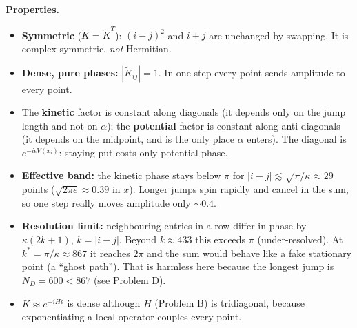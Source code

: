 \documentclass[10pt]{article}
\begin{document}
\textbf{Properties.}
\begin{itemize}
\item \textbf{Symmetric} ($\tilde K=\tilde K^T$): $(i-j)^2$ and $i+j$ are unchanged by swapping. It is complex symmetric, \emph{not} Hermitian.
\item \textbf{Dense, pure phases:} $|\tilde K_{ij}|=1$. In one step every point sends amplitude to every point.
\item The \textbf{kinetic} factor is constant along diagonals (it depends only on the jump length and not on $\alpha$); the \textbf{potential} factor is constant along anti-diagonals (it depends on the midpoint, and is the only place $\alpha$ enters). The diagonal is $e^{-i\epsilon V(x_i)}$: staying put costs only potential phase.
\item \textbf{Effective band:} the kinetic phase stays below $\pi$ for $|i-j|\lesssim\sqrt{\pi/\kappa}\approx29$ points ($\sqrt{2\pi\epsilon}\approx0.39$ in $x$). Longer jumps spin rapidly and cancel in the sum, so one step really moves amplitude only $\sim0.4$.
\item \textbf{Resolution limit:} neighbouring entries in a row differ in phase by $\kappa(2k+1)$, $k=|i-j|$. Beyond $k\approx433$ this exceeds $\pi$ (under-resolved). At $k^*=\pi/\kappa\approx867$ it reaches $2\pi$ and the sum would behave like a fake stationary point (a ``ghost path''). That is harmless here because the longest jump is $N_D=600<867$ (see Problem D).
\item $\tilde K\approx e^{-iH\epsilon}$ is dense although $H$ (Problem B) is tridiagonal, because exponentiating a local operator couples every point.
\end{itemize}
\end{document}
